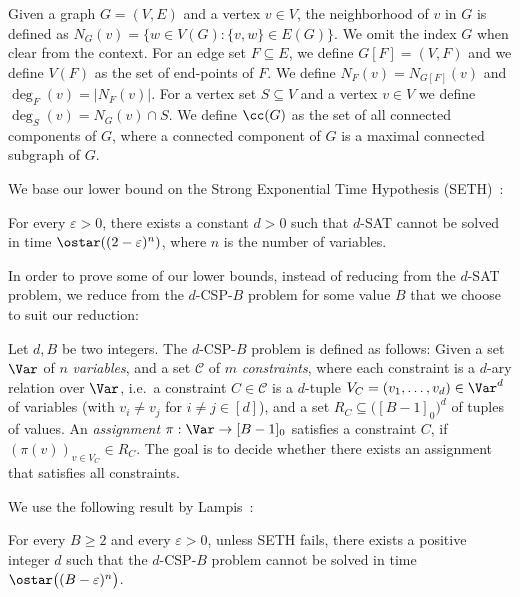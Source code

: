 \documentclass[a4paper,UKenglish,cleveref, autoref, thm-restate]{lipics-v2021}
\begin{document}
Given a graph $G = (V,E)$ and a vertex $v\in V$, the neighborhood of $v$ in $G$ is defined as $N_G(v) = \{w\in V(G)\colon \{v,w\}\in E(G)\}$. We omit the index $G$ when clear from the context. For an edge set $F\subseteq E$, we define $G[F] = (V, F)$ and we define $V(F)$ as the set of end-points of $F$. We define $N_F(v) = N_{G[F]}(v)$ and $\deg_F(v) = |N_F(v)|$. For a vertex set $S\subseteq V$ and a vertex $v\in V$ we define $\deg_S(v) = N_G(v) \cap S$.
We define $\cc(G)$ as the set of all connected components of $G$, where a connected component of $G$ is a maximal connected subgraph of $G$.

We base our lower bound on the Strong Exponential Time Hypothesis (SETH)~\cite{DBLP:journals/jcss/ImpagliazzoP01}:
\begin{conjecture}[SETH]
	For every $\varepsilon > 0$, there exists a constant $d > 0$ such that $d$-SAT cannot be solved in time $\ostar((2-\varepsilon)^n)$, where $n$ is the number of variables.
\end{conjecture}


In order to prove some of our lower bounds, instead of reducing from the $d$-SAT problem, we reduce from the $d$-CSP-$B$ problem for some value $B$ that we choose to suit our reduction:

\begin{definition}
Let $d, B$ be two integers. The $d$-CSP-$B$ problem is defined as follows: Given a set $\Var$ of $n$ \emph{variables}, and a set $\mathcal{C}$ of $m$ \emph{constraints}, where each constraint is a $d$-ary relation over $\Var$, i.e.\ a constraint $C\in \mathcal{C}$ is a $d$-tuple $V_C = (v_1, \dots, v_d) \in \Var^d$ of variables (with $v_i \neq v_j$ for $i \neq j \in [d]$), and a set $R_C\subseteq \big([B-1]_0\big)^{d}$ of tuples of values. An \emph{assignment} $\pi:\Var \rightarrow [B-1]_0$ satisfies a constraint $C$, if $(\pi(v))_{v\in V_C} \in R_C$. The goal is to decide whether there exists an assignment that satisfies all constraints.
\end{definition}

We use the following result by Lampis~\cite{DBLP:journals/siamdm/Lampis20}:

\begin{theorem}\label{lb:theo:lampis}
    For every $B\geq 2$ and every $\varepsilon > 0$, unless SETH fails, there exists a positive integer $d$ such that the $d$-CSP-$B$ problem cannot be solved in time $\ostar\big((B-\varepsilon)^{n}\big)$.
\end{theorem}
\end{document}
